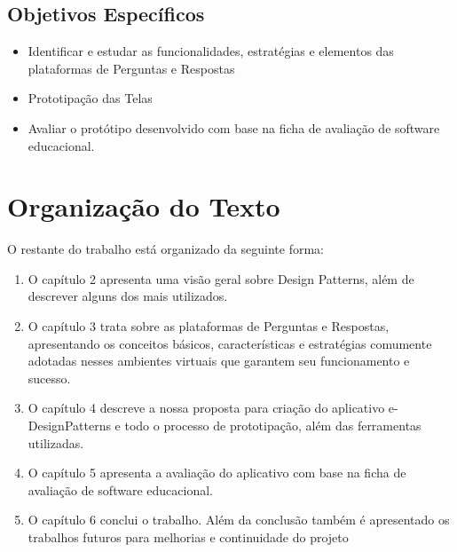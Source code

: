 \subsection{Objetivos Específicos}
\begin{itemize}
	\item Identificar e estudar as funcionalidades, estratégias e elementos das plataformas de Perguntas e Respostas
	\item Prototipação das Telas
	\item Avaliar o protótipo desenvolvido com base na ficha de avaliação de software educacional.
	
\end{itemize}


\section{Organização do Texto}%

O restante do trabalho está organizado da seguinte forma:

\begin{enumerate}
	\item O capítulo 2 apresenta uma visão geral sobre Design Patterns, além de descrever alguns dos mais utilizados.
	\item O capítulo 3 trata sobre as plataformas de Perguntas e Respostas, apresentando os conceitos básicos, características e estratégias comumente adotadas nesses ambientes virtuais que garantem seu funcionamento e sucesso.
	\item O capítulo 4 descreve a nossa proposta para criação do aplicativo e-DesignPatterns e todo o processo de prototipação, além das ferramentas utilizadas.
	\item O capítulo 5 apresenta a avaliação do aplicativo com base na ficha de avaliação de software educacional.
	\item O capítulo 6 conclui o trabalho. Além da conclusão também é apresentado os trabalhos futuros para melhorias e continuidade do projeto
\end{enumerate}





